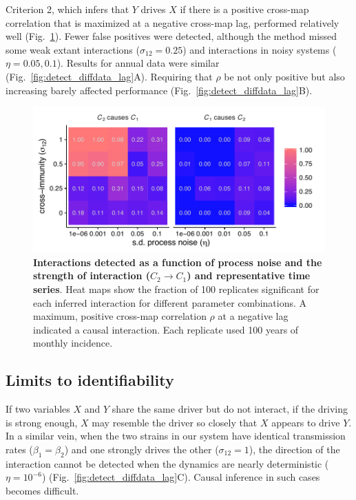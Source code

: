 Criterion 2, which infers that $Y$ drives $X$ if there is a positive cross-map correlation that is maximized at a negative cross-map lag, performed relatively well (Fig.~\ref{fig:univar_monthly_lag_seas_diff_tmp}).
Fewer false positives were detected, although the method missed some weak extant interactions ($\sigma_{12}=0.25$) and interactions in noisy systems ($\eta=0.05, 0.1$).
Results for annual data were similar (Fig.~\ref{fig:detect_diffdata_lag}A).
Requiring that $\rho$ be not only positive but also increasing barely affected performance (Fig.~\ref{fig:detect_diffdata_lag}B). 

\begin{figure}
\begin{center}
  \includegraphics[width=6in]{dataflow/out/fig_detect_lag/fig_detect_lag.pdf}
  \end{center}
  \caption{\textbf{Interactions detected as a function of process noise and the strength of interaction ($C_2 \rightarrow C_1$) and representative time series}. Heat maps show the fraction of 100 replicates significant for each inferred interaction for different parameter combinations. A maximum, positive cross-map correlation $\rho$ at a negative lag indicated a causal interaction. Each replicate used 100 years of monthly incidence. \label{fig:univar_monthly_lag_seas_diff_tmp}} 
\end{figure}

\subsection*{Limits to identifiability}

If two variables $X$ and $Y$ share the same driver but do not interact, if the driving is strong enough, $X$ may resemble the driver so closely that $X$ appears to drive $Y$.
In a similar vein, when the two strains in our system have identical transmission rates ($\beta_1= \beta_2$) and one strongly drives the other ($\sigma_{12}=1$), the direction of the interaction cannot be detected when the dynamics are nearly deterministic ($\eta=10^{-6}$) (Fig.~\ref{fig:detect_diffdata_lag}C). 
Causal inference in such cases becomes difficult.


